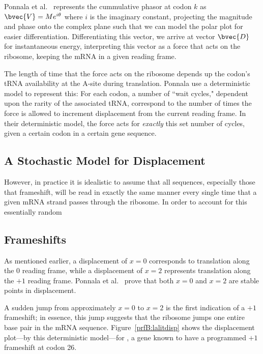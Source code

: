 \documentclass[12pt, draft]{article}
\numberwithin{equation}{section}
\begin{document}
Ponnala et al.~\cite{lalit:embs} represents the cummulative phasor at codon $k$ as $\bvec{V} = Me^{i\theta}$
where $i$ is the imaginary constant, projecting the magnitude and phase onto the complex plane such that
we can model the polar plot for easier differentiation.
Differentiating this vector, we arrive at vector $\bvec{D}$ for instantaneous energy, interpreting this
vector as a force that acts on the ribosome, keeping the mRNA in a given reading frame.

The length of time that the force acts on the ribosome depends up the codon's tRNA availability at the A-site during translation.
Ponnala use a deterministic model to represent this: For each codon, a number
of ``wait cycles," dependent upon the rarity of the associated tRNA, correspond to the number
of times the force is allowed to increment displacement from the current reading frame.
In their deterministic model, the force acts for \emph{exactly} this set number of cycles, given a certain codon in a certain gene sequence.

\subsection{A Stochastic Model for Displacement}

However, in practice it is idealistic to assume that all sequences, especially those that frameshift, will be read in exactly the same manner every single time that a given mRNA strand passes through the ribosome.  In order to account for this essentially random 

\subsection{Frameshifts}


As mentioned earlier, a displacement of $x = 0$ corresponds to translation along the 0 reading frame,
while a displacement of $x = 2$ represents translation along the $+1$ reading frame.
Ponnala et al.~\cite{lalit:embs} prove that both $x = 0$ and $x = 2$ are stable points in displacement.


A sudden jump from approximately $x = 0$ to $x = 2$ is the first indication of a $+1$ frameshift; 
in essence, this jump suggests that the ribosome jumps one entire base pair in the mRNA sequence.
Figure~\ref{prfB:lalitdisp} shows the displacement plot---by this deterministic model---for \prfB, 
a gene known to have a programmed $+1$ frameshift at codon 26.
\end{document}

